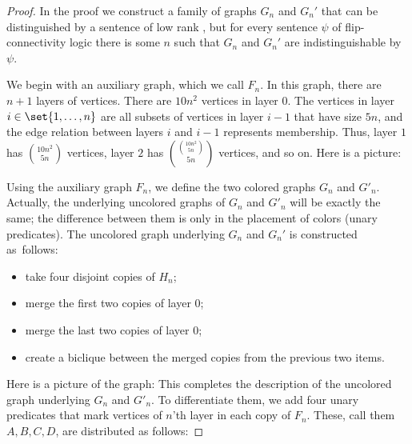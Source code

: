 \begin{proof}
    In the proof we construct a family of graphs $G_n$ and $G_n'$ that can be distinguished by a sentence of low rank \mso, but for every sentence $\psi$ of flip-connectivity logic there is some $n$ such that $G_n$ and $G_n'$ are indistinguishable by $\psi$.

    We begin with an auxiliary graph, which we call $F_n$. In this graph, there are $n+1$ layers of vertices. There are $10n^2$ vertices in layer $0$. The vertices in layer $i \in \set{1,\ldots,n}$ are all subsets of vertices in layer $i-1$ that have size $5n$, and the edge relation between layers $i$ and $i-1$ represents membership. Thus, layer $1$ has $\binom{10n^2}{5n}$ vertices, layer $2$ has $\binom{\binom{10n^2}{5n}}{5n}$ vertices, and so on. Here is a picture:

    
    Using the auxiliary graph $F_n$, we define the two colored graphs $G_n$ and $G'_n$. Actually, the underlying uncolored graphs of $G_n$ and $G'_n$ will be exactly the same; the difference between them is only in the placement of colors (unary predicates). The uncolored graph underlying $G_n$ and $G_n'$ is constructed as~follows:
        \begin{itemize}[nosep]
            \item take four disjoint copies of $H_n$;
            \item merge the first two copies of layer 0;
            \item merge the last two copies of layer 0;
            \item create a biclique between the merged copies from the previous two items.
        \end{itemize}
    Here is a picture of the graph: 
    This completes the description of the uncolored graph underlying  $G_n$ and $G'_n$. To differentiate them, we add four unary predicates that mark vertices of $n$'th layer in each copy of $F_n$. These, call them $A, B, C, D$, are distributed as follows:


\end{proof}
